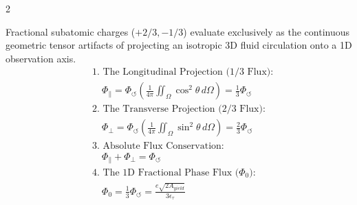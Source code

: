 \documentclass[11pt, a4paper]{article}
\newcounter{cheatnum}
\begin{document}
\begin{multicols}{2}
\begin{tcolorbox}[cheatbox, title={\refstepcounter{cheatnum}\label{box:tensor_projections}\thecheatnum. 1D Fractional Phase Flux (Dimensional Projections) \scriptsize\hfill\hyperref[sec:deriv_tensor_projections]{[Proof $\downarrow$]}}]
Fractional subatomic charges ($+2/3, -1/3$) evaluate exclusively as the continuous geometric tensor artifacts of projecting an isotropic 3D fluid circulation onto a 1D observation axis.
\begin{align}
    &\text{1. The Longitudinal Projection (1/3 Flux):} \nonumber \\
    &\quad \Phi_{\parallel} = \Phi_{\circlearrowleft} \left( \frac{1}{4\pi} \iint_{\Omega} \cos^2 \theta \, d\Omega \right) = \frac{1}{3} \Phi_{\circlearrowleft} \label{eq:tensor_long} \\
    &\text{2. The Transverse Projection (2/3 Flux):} \nonumber \\
    &\quad \Phi_{\perp} = \Phi_{\circlearrowleft} \left( \frac{1}{4\pi} \iint_{\Omega} \sin^2 \theta \, d\Omega \right) = \frac{2}{3} \Phi_{\circlearrowleft} \label{eq:tensor_trans} \\
    &\text{3. Absolute Flux Conservation:} \nonumber \\
    &\quad \Phi_{\parallel} + \Phi_{\perp} = \Phi_{\circlearrowleft} \label{eq:projection_conservation} \\
    &\text{4. The 1D Fractional Phase Flux ($\Phi_0$):} \nonumber \\
    &\quad \Phi_0 = \frac{1}{3}\Phi_{\circlearrowleft} = \frac{e\sqrt{2A_{yield}}}{3\epsilon_{\tau}} \label{eq:1d_phase_flux}
\end{align}
\end{tcolorbox}


\end{multicols}
\end{document}

